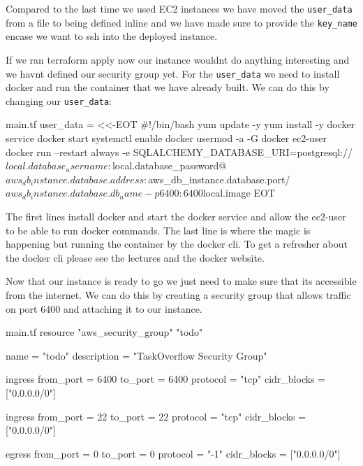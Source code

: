\documentclass{csse4400}
\begin{document}
Compared to the last time we used EC2 instances we have moved the \texttt{user\_data} from a file to being defined inline and we have made sure to provide the \texttt{key\_name} encase we want to ssh into the deployed instance.

If we ran terraform apply now our instance wouldnt do anything interesting and we havnt defined our security group yet. For the \texttt{user\_data} we need to install docker and run the container that we have already built. We can do this by changing our \texttt{user\_data}:

\begin{code}[language=terraform,numbers=none]{main.tf}
  user_data                   = <<-EOT
  #!/bin/bash
  yum update -y
  yum install -y docker
  service docker start
  systemctl enable docker
  usermod -a -G docker ec2-user 
  docker run --restart always -e SQLALCHEMY_DATABASE_URI=postgresql://${local.database_username}:${local.database_password}@${aws_db_instance.database.address}:${aws_db_instance.database.port}/${aws_db_instance.database.db_name} -p 6400:6400 ${local.image}
  EOT
\end{code}

The first lines install docker and start the docker service and allow the ec2-user to be able to run docker commands. The last line is where the magic is happening but running the container by the docker cli. To get a refresher about the docker cli please see the lectures and the docker website. 


Now that our instance is ready to go we just need to make sure that its accessible from the internet. We can do this by creating a security group that allows traffic on port 6400 and attaching it to our instance.

\begin{code}[language=terraform,numbers=none]{main.tf}
  resource "aws_security_group" "todo" {
    name = "todo"
    description = "TaskOverflow Security Group"
  
    ingress {
      from_port = 6400
      to_port = 6400
      protocol = "tcp"
      cidr_blocks = ["0.0.0.0/0"]
    }
  
    ingress {
      from_port = 22
      to_port = 22
      protocol = "tcp"
      cidr_blocks = ["0.0.0.0/0"]
    }
  
    egress {
      from_port = 0
      to_port = 0
      protocol = "-1"
      cidr_blocks = ["0.0.0.0/0"]
    }
  }
\end{code}
\end{document}
